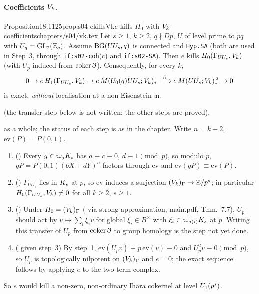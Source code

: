 \paragraph{Coefficients $V_k$.}
\begin{quoted}{Proposition}{18.1}{125}{prop:s04-ekillsVk}{$e$ kills $H_0$ with $V_k$-coefficients}{chapters/s04/vk.tex}\label{rpt:prop:s04-ekillsVk}
Let $s\ge1$, $k\ge2$, $q\nmid Dp$, $U$ of level prime to $pq$ with $U_q=\mathrm{GL}_2(\mathbb{Z}_q)$. Assume $\mathrm{BG}(UU_s,q)$ is connected and \texttt{Hyp.SA}
(both are used in Step~3, through \texttt{if:s02-coh}(c) and \texttt{if:s02-SA}). Then $e$ kills $H_0(\Gamma_{UU_s},V_k)$ (with
$U_p$ induced from $\operatorname{coker}\partial$). Consequently, for every $k$,
\[0\to e\,H_1(\Gamma_{UU_s},\Vk)\to e\,\Brandt{\Uzero{q}UU_s}{\Vk}_*\xrightarrow{\ \partial\ }e\,\Brandt{UU_s}{\Vk}_*^{\,2}\to0\]
is exact, \emph{without} localisation at a non-Eisenstein $\mathfrak{m}$.
\par\smallskip{}\par
\noindent\sttoprove{} (the transfer step below is not written; the other steps are proved).
\end{quoted}
\begin{outline}
\sttoprove{} as a whole; the status of each step is as in the chapter. Write $n=k-2$, $\mathrm{ev}(P)=P(0,1)$.
\begin{enumerate}[label=\arabic*.]
\item (\stproved) Every $g\in\varpi_jK_{s}$ has $a\equiv c\equiv0$, $d\equiv1\pmod p$, so modulo $p$, $gP=P(0,1)(bX+dY)^n$ factors
  through $\mathrm{ev}$ and $\mathrm{ev}(gP)\equiv\mathrm{ev}(P)$.
\item (\stproved) $\Gamma_{UU_s}$ lies in $K_{s}$ at $p$, so $\mathrm{ev}$ induces a surjection $(V_k)_\Gamma\to\mathbb{Z}/p^s$; in particular
  $H_0(\Gamma_{UU_s},V_k)\ne0$ for all $k\ge2$, $s\ge1$.
\item (\sttoprove) Under $H_0=(V_k)_\Gamma$ (\stpmc{} via strong approximation, main.pdf, Thm.~7.7), $U_p$ should act by
  $v\mapsto\sum_i\xi_iv$ for global $\xi_i\in B^\times$ with $\xi_i\in\varpi_{j(i)}K_{s}$ at $p$. Writing this transfer of $U_p$ from
  $\operatorname{coker}\partial$ to group homology is the step not yet done.
\item (\stproved{} given step~3) By step~1, $\mathrm{ev}(U_pv)\equiv p\,\mathrm{ev}(v)\equiv0$ and $U_p^2v\equiv0\pmod p$, so $U_p$ is
  topologically nilpotent on $(V_k)_\Gamma$ and $e=0$; the exact sequence follows by applying $e$ to the two-term complex.
\end{enumerate}
So $e$ would kill a non-zero, non-ordinary Ihara cokernel at level $U_1(p^s)$.
\end{outline}

